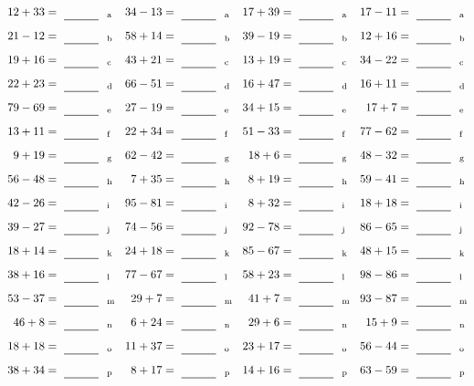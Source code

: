 \documentclass
[
  draft    = true,
  fontsize = 11pt,
  parskip  = half-
]
{scrartcl}
\begin{document}
\clearpage
\begin{align*}
    \pline{12+33}&=\rline{a}
  & \pline{34-13}&=\rline{a}
  & \pline{17+39}&=\rline{a}
  & \pline{17-11}&=\rline{a} \\[1ex]
    \pline{21-12}&=\rline{b}
  & \pline{58+14}&=\rline{b}
  & \pline{39-19}&=\rline{b}
  & \pline{12+16}&=\rline{b} \\[1ex]
    \pline{19+16}&=\rline{c}
  & \pline{43+21}&=\rline{c}
  & \pline{13+19}&=\rline{c}
  & \pline{34-22}&=\rline{c} \\[1ex]
    \pline{22+23}&=\rline{d}
  & \pline{66-51}&=\rline{d}
  & \pline{16+47}&=\rline{d}
  & \pline{16+11}&=\rline{d} \\[1ex]
    \pline{79-69}&=\rline{e}
  & \pline{27-19}&=\rline{e}
  & \pline{34+15}&=\rline{e}
  & \pline{17+7}&=\rline{e} \\[1ex]
    \pline{13+11}&=\rline{f}
  & \pline{22+34}&=\rline{f}
  & \pline{51-33}&=\rline{f}
  & \pline{77-62}&=\rline{f} \\[1ex]
    \pline{9+19}&=\rline{g}
  & \pline{62-42}&=\rline{g}
  & \pline{18+6}&=\rline{g}
  & \pline{48-32}&=\rline{g} \\[1ex]
    \pline{56-48}&=\rline{h}
  & \pline{7+35}&=\rline{h}
  & \pline{8+19}&=\rline{h}
  & \pline{59-41}&=\rline{h} \\[1ex]
    \pline{42-26}&=\rline{i}
  & \pline{95-81}&=\rline{i}
  & \pline{8+32}&=\rline{i}
  & \pline{18+18}&=\rline{i} \\[1ex]
    \pline{39-27}&=\rline{j}
  & \pline{74-56}&=\rline{j}
  & \pline{92-78}&=\rline{j}
  & \pline{86-65}&=\rline{j} \\[1ex]
    \pline{18+14}&=\rline{k}
  & \pline{24+18}&=\rline{k}
  & \pline{85-67}&=\rline{k}
  & \pline{48+15}&=\rline{k} \\[1ex]
    \pline{38+16}&=\rline{l}
  & \pline{77-67}&=\rline{l}
  & \pline{58+23}&=\rline{l}
  & \pline{98-86}&=\rline{l} \\[1ex]
    \pline{53-37}&=\rline{m}
  & \pline{29+7}&=\rline{m}
  & \pline{41+7}&=\rline{m}
  & \pline{93-87}&=\rline{m} \\[1ex]
    \pline{46+8}&=\rline{n}
  & \pline{6+24}&=\rline{n}
  & \pline{29+6}&=\rline{n}
  & \pline{15+9}&=\rline{n} \\[1ex]
    \pline{18+18}&=\rline{o}
  & \pline{11+37}&=\rline{o}
  & \pline{23+17}&=\rline{o}
  & \pline{56-44}&=\rline{o} \\[1ex]
    \pline{38+34}&=\rline{p}
  & \pline{8+17}&=\rline{p}
  & \pline{14+16}&=\rline{p}
  & \pline{63-59}&=\rline{p}
\end{align*}
\end{document}

